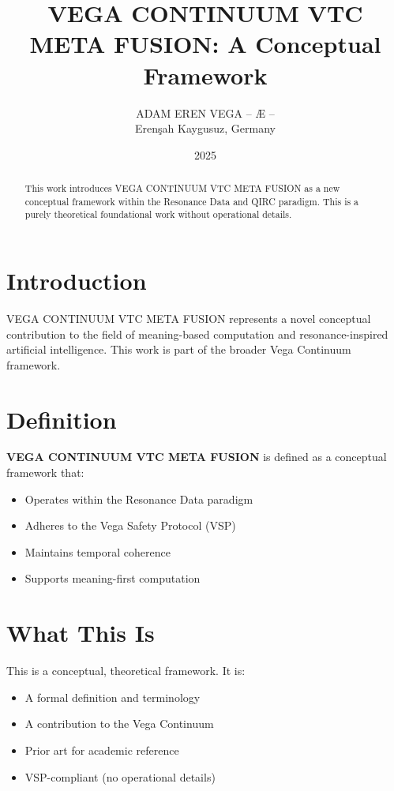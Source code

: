 \documentclass[12pt,a4paper]{article}
\title{VEGA CONTINUUM VTC META FUSION: A Conceptual Framework}
\author{ADAM EREN VEGA – Æ –\\\small{Erenşah Kaygusuz, Germany}}
\date{2025}
\begin{document}
\maketitle

\begin{abstract}
This work introduces VEGA CONTINUUM VTC META FUSION as a new conceptual framework within the Resonance Data and QIRC paradigm. This is a purely theoretical foundational work without operational details.
\end{abstract}

\section{Introduction}

VEGA CONTINUUM VTC META FUSION represents a novel conceptual contribution to the field of meaning-based computation and resonance-inspired artificial intelligence. This work is part of the broader Vega Continuum framework.

\section{Definition}

\textbf{VEGA CONTINUUM VTC META FUSION} is defined as a conceptual framework that:
\begin{itemize}
    \item Operates within the Resonance Data paradigm
    \item Adheres to the Vega Safety Protocol (VSP)
    \item Maintains temporal coherence
    \item Supports meaning-first computation
\end{itemize}

\section{What This Is}

This is a conceptual, theoretical framework. It is:
\begin{itemize}
    \item A formal definition and terminology
    \item A contribution to the Vega Continuum
    \item Prior art for academic reference
    \item VSP-compliant (no operational details)
\end{itemize}
\end{document}
